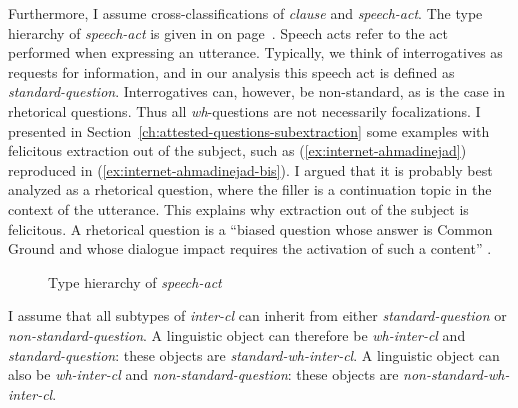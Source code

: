 Furthermore, I assume cross-classifications of \emph{clause} and \emph{speech-act}. The type hierarchy of \emph{speech-act} is given in  on page~\pageref{fig:hrch-speech-act}. Speech acts refer to the act performed when expressing an utterance. Typically, we think of interrogatives as requests for information, and in our analysis this speech act is defined as \emph{standard-question}. Interrogatives can, however, be non-standard, as is the case in rhetorical questions. Thus all \emph{wh}-questions are not necessarily focalizations. I presented in Section~\ref{ch:attested-questions-subextraction} some examples with felicitous extraction out of the subject, such as (\ref{ex:internet-ahmadinejad}) reproduced in (\ref{ex:internet-ahmadinejad-bis}). I argued that it is probably best analyzed as a rhetorical question, where the filler is a continuation topic in the context of the utterance. This explains why extraction out of the subject is felicitous. A rhetorical question is a ``biased question whose answer is Common Ground and whose dialogue impact requires the activation of such a content'' \citep[441]{Marandin.2008}. 

\begin{figure}[ht]
\centering
{}
    \caption{Type hierarchy of \emph{speech-act}}
    \label{fig:hrch-speech-act}
\end{figure}

\label{ex:internet-ahmadinejad-bis}
\z 

I assume that all subtypes of \emph{inter-cl} can inherit from either \textit{standard-question} or \textit{non-standard-question}. A linguistic object can therefore be \emph{wh-inter-cl} and \emph{standard-question}: these objects are \emph{standard-wh-inter-cl}. A linguistic object can also be \emph{wh-inter-cl} and \emph{non-standard-question}: these objects are \emph{non-standard-wh-inter-cl}. 

